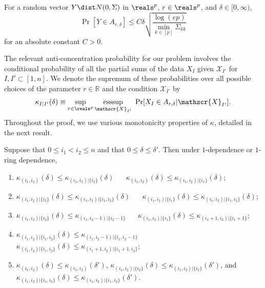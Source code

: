 \documentclass[aos]{imsart}
\begin{document}
\begin{lemma}
\label{thm:G_anti_conc}
For a random vector $Y \dist N(0,\Sigma)$ in $\reals^p$, $r \in \reals^p$, and $\delta \in [0, \infty)$,
\begin{equation*}
    \Pr[Y \in A_{r,\delta}] \leq C \delta \sqrt{\frac{\log(ep)}{\min_{k \in [p]} \Sigma_{kk}}}
\end{equation*}
for an absolute constant $C > 0$.
\end{lemma} 

The relevant anti-concentration probability for our problem involves the conditional probability of all the partial sums of the data $X_{I}$ given $\mathscr{X}_{I'}$ for $I, I' \subset [1,n]$. We denote the supremum of these probabilities over all possible choices of the parameter $r \in \mathbb{R}$ and the condition $\mathscr{X}_{I'}$ by
\begin{equation*}
    \kappa_{I|I'}(\delta) \equiv \sup_{r\in\reals^p} \underset{\mathscr{X}_{I'}}{\mathrm{esssup}} ~\Pr[X_{I} \in A_{r,\delta} | \mathscr{X}_{I'}].
\end{equation*}
Throughout the proof, we use various  monotonicity properties of $\kappa$, detailed in the next result. 
\begin{lemma} \label{thm:kappa_comparison} 
    Suppose that $0 \leq i_1 < i_2 \leq n$ and that $0 \leq \delta \leq \delta'$. Then under $1$-dependence or $1$-ring dependence,
    \begin{enumerate}
        \item $\kappa_{(i_1,i_2)}(\delta) \leq \kappa_{(i_1,i_2)|\{i_2\}}(\delta)$
        ~~
        $\kappa_{(i_1,i_2)}(\delta) \leq \kappa_{(i_1,i_2)|\{i_1\}}(\delta)$;
        \item $\kappa_{(i_1,i_2)|\{i_2\}}(\delta) \leq \kappa_{(i_1,i_2)|\{i_1,i_2\}}(\delta)$
        ~~
        $\kappa_{(i_1,i_2)|\{i_1\}}(\delta) \leq \kappa_{(i_1,i_2)|\{i_1,i_2\}}(\delta)$;
        \item $\kappa_{(i_1,i_2)|\{i_2\}}(\delta) \leq \kappa_{(i_1,i_2-1)|\{i_2-1\}}$ 
        ~~
        $\kappa_{(i_1,i_2)|\{i_1\}}(\delta) \leq \kappa_{(i_1+1,i_2)|\{i_1+1\}}$;
        \item $\kappa_{(i_1,i_2)|\{i_1,i_2\}}(\delta) \leq \kappa_{(i_1,i_2-1)|\{i_1,i_2-1\}}$ 
        ~~
        $\kappa_{(i_1,i_2)|\{i_1,i_2\}}(\delta) \leq \kappa_{(i_1+1,i_2)|\{i_1+1,i_2\}}$;
        \item $\kappa_{(i_1,i_2)}(\delta) \leq \kappa_{(i_1,i_2)}(\delta')$, 
        $\kappa_{(i_1,i_2)|\{i_2\}}(\delta) \leq \kappa_{(i_1,i_2)|\{i_2\}}(\delta')$, 
        and $\kappa_{(i_1,i_2)|\{i_1,i_2\}}(\delta) \leq \kappa_{(i_1,i_2)|\{i_1,i_2\}}(\delta')$.
    \end{enumerate}
\end{lemma}
\end{document}
